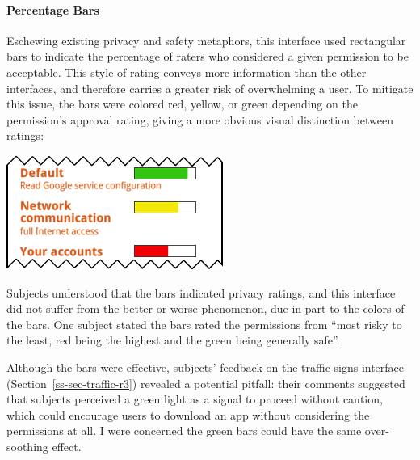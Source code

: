 \documentclass[11pt]{article}
\newcommand{\refsec}[1]{Section~\ref{#1}}
\begin{document}
\paragraph{Percentage Bars}
\label{s-sec-pbars}

Eschewing existing privacy and safety metaphors,
this interface used rectangular bars to indicate 
the percentage of raters who considered a given permission to be acceptable.
This style of rating conveys more information than the other
interfaces, and therefore carries a greater risk of overwhelming a user. To mitigate this 
issue, the bars were colored red, yellow, or green depending on the permission's approval 
rating, giving a more obvious visual distinction between ratings:
\label{ss-sec-pbars-r1}
\begin{center}
\includegraphics[width=.5\linewidth]{candidate-img/bars/barsR1.png}
\end{center}
Subjects understood that the bars indicated privacy ratings, 
and this interface did not suffer from the better-or-worse
phenomenon, due in part to the colors of the bars. 
One subject stated the bars rated the permissions from ``most risky to the least, 
red being the highest and the green being generally safe''.

Although the bars were effective, subjects' feedback on 
the traffic signs interface (\refsec{ss-sec-traffic-r3}) 
revealed a potential pitfall: their comments suggested that subjects 
perceived a green light as a signal to proceed without caution, which could 
encourage users to download an app without considering the permissions at all. I were concerned the green bars 
could have the same over-soothing effect.
\end{document}

